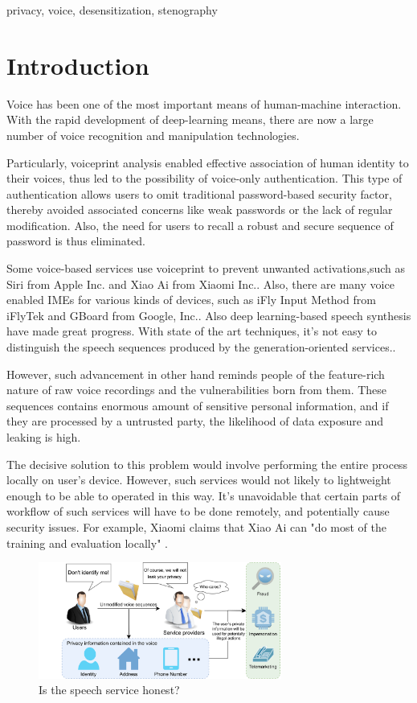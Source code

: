 \documentclass[journal]{IEEEtran} %
\begin{document}
\begin{CJK*}{UTF8}{gbsn}
\begin{IEEEkeywords}
    privacy, voice, desensitization, stenography
\end{IEEEkeywords}

\section{Introduction}
Voice has been one of the most important means of human-machine interaction. With the rapid development of deep-learning means, there are now a large number of voice recognition and manipulation technologies.

Particularly, voiceprint analysis enabled effective association of human identity to their voices, thus led to the possibility of voice-only authentication. This type of authentication allows users to omit traditional password-based security factor, thereby avoided associated concerns like weak passwords or the lack of regular modification. Also, the need for users to recall a robust and secure sequence of password is thus eliminated.

Some voice-based services use voiceprint to prevent unwanted activations,such as Siri from Apple Inc. and Xiao Ai from Xiaomi Inc.\cite{a19, a20}. Also, there are many voice enabled IMEs for various kinds of devices, such as iFly Input Method from iFlyTek and GBoard from Google, Inc.\cite{a21, a22}. Also deep learning-based speech synthesis have made great progress. With state of the art techniques, it's not easy to distinguish the speech sequences produced by the generation-oriented services.\cite{a12}.

However, such advancement in other hand reminds people of the feature-rich nature of raw voice recordings and the vulnerabilities born from them\cite{a6, a7}. These sequences contains enormous amount of sensitive personal information, and if they are processed by a untrusted party, the likelihood of data exposure and leaking is high.

The decisive solution to this problem would involve performing the entire process locally on user's device. However, such services would not likely to lightweight enough to be able to operated in this way. It's unavoidable that certain parts of workflow of such services will have to be done remotely, and potentially cause security issues. For example, Xiaomi claims that Xiao Ai can "do most of the training and evaluation locally" \cite{a20}.

\begin{figure}[htbp]
    \centerline{\includegraphics[width=8cm]{case2v3.png}}
    \caption{Is the speech service honest?}
    \label{case2}
\end{figure}


\end{CJK*}
\end{document}
